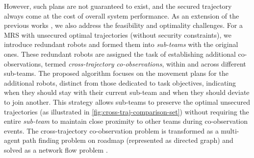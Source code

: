 \documentclass[10pt,twocolumn,twoside]{IEEEtran}
\begin{document}
However, such plans are not guaranteed to exist, and the secured trajectory always come at the cost of overall system performance. As an extension of the previous works \cite{yang2020multi,yang2021multi}, we also address the feasibility and optimality challenges. For a MRS with unsecured optimal trajectories (without security constraints), we introduce redundant robots and formed them into \emph{sub-teams} with the original ones. These redundant robots are assigned the task of establishing additional co-observations, termed \emph{cross-trajectory co-observations}, within and across different sub-teams. The proposed algorithm focuses on the movement plans for the additional robots, distinct from those dedicated to task objectives, indicating when they should stay with their current sub-team and when they should deviate to join another. This strategy allows sub-teams to preserve the optimal unsecured trajectories (as illustrated in \cref{fig:cross-traj-comparison-set}) without requiring the entire \emph{sub-team} to maintain close proximity to other teams during co-observation events. The cross-trajectory co-observation problem is transformed as a multi-agent path finding problem on roadmap (represented as directed graph) and solved as a network flow problem \cite{yu2013multi}.
\end{document}
